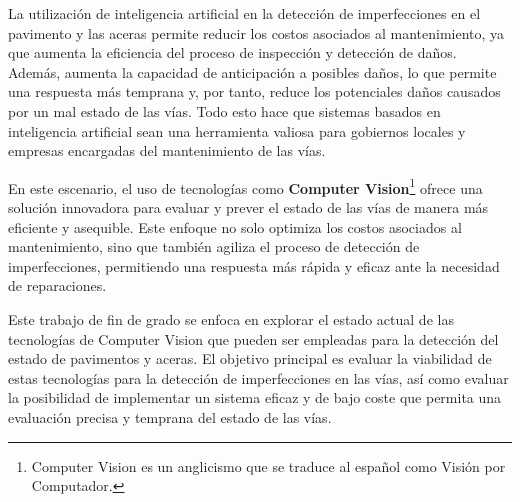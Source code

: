 La utilización de inteligencia artificial en la detección de imperfecciones en el pavimento y las aceras permite reducir los costos asociados al mantenimiento, ya que aumenta la eficiencia del proceso de inspección y detección de daños. Además, aumenta la capacidad de anticipación a posibles daños, lo que permite una respuesta más temprana y, por tanto, reduce los potenciales daños causados por un mal estado de las vías. Todo esto hace que sistemas basados en inteligencia artificial sean una herramienta valiosa para gobiernos locales y empresas encargadas del mantenimiento de las vías.

En este escenario, el uso de tecnologías como \textbf{Computer Vision}\footnote{Computer Vision es un anglicismo que se traduce al español como Visión por Computador.} ofrece una solución innovadora para evaluar y prever el estado de las vías de manera más eficiente y asequible. Este enfoque no solo optimiza los costos asociados al mantenimiento, sino que también agiliza el proceso de detección de imperfecciones, permitiendo una respuesta más rápida y eficaz ante la necesidad de reparaciones.

Este trabajo de fin de grado se enfoca en explorar el estado actual de las tecnologías de Computer Vision que pueden ser empleadas para la detección del estado de pavimentos y aceras. El objetivo principal es evaluar la viabilidad de estas tecnologías para la detección de imperfecciones en las vías, así como evaluar la posibilidad de implementar un sistema eficaz y de bajo coste que permita una evaluación precisa y temprana del estado de las vías.